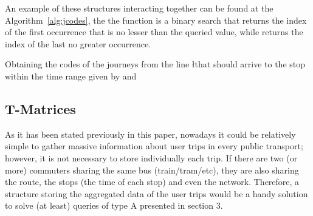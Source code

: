 \documentclass[runningheads]{llncs}
\newcommand{\acumm}{T-Matrices} %
\begin{document}
An example of these structures interacting together can be found at the Algorithm~\ref{alg:jcodes}, the the function  is a binary search that returns the index of the first occurrence that is no lesser than the queried value, while  returns the index of the last no greater occurrence.

\begin{algorithm}[H]
 
 
 \caption{Obtaining the codes of the journeys from the line \l that should arrive to the stop \s within the time range given by \ta and \tz}
 \label{alg:jcodes}
\end{algorithm}

\subsection{\acumm}
\label{sec:acumm}
As it has been stated previously in this paper, nowadays it could be relatively simple to gather massive information about user trips in every public transport; however, it is not necessary to store individually each trip. If there are two (or more) commuters sharing the same bus (train/tram/etc), they are also sharing the route, the stops (the time of each stop) and even the network. Therefore, a structure storing the aggregated data of the user trips would be a handy solution to solve (at least) queries of type A presented in section 3.
\end{document}
